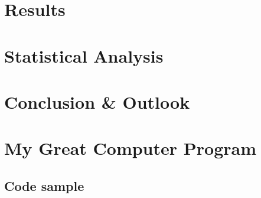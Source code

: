 \documentclass[12pt]{report}
\begin{document}
\chapter{Results}
\chapter{Statistical Analysis}

\chapter{Conclusion \& Outlook}



\appendix
\chapter{My Great Computer Program}

\section{Code sample}


\end{document}
